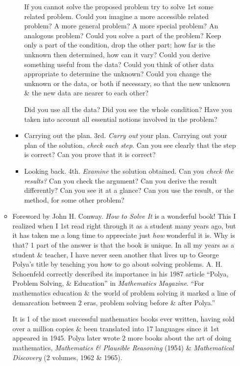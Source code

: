 \documentclass{article}
\begin{document}
\begin{enumerate}
\begin{itemize}
\begin{itemize}
			If you cannot solve the proposed problem try to solve 1st some related problem. Could you imagine a more accessible related problem? A more general problem? A more special problem? An analogous problem? Could you solve a part of the problem? Keep only a part of the condition, drop the other part; how far is the unknown then determined, how can it vary? Could you derive something useful from the data? Could you think of other data appropriate to determine the unknown? Could you change the unknown or the data, or both if necessary, so that the new unknown \& the new data are nearer to each other?
			
			Did you use all the data? Did you see the whole condition? Have you taken into account all essential notions involved in the problem?
			\item {\sc Carrying out the plan.} 3rd. {\it Carry out} your plan. Carrying out your plan of the solution, {\it check each step}. Can you see clearly that the step is correct? Can you prove that it is correct?
			\item {\sc Looking back}. 4th. {\it Examine} the solution obtained. Can you {\it check the results?} Can you check the argument? Can you derive the result differently? Can you see it at a glance? Can you use the result, or the method, for some other problem?
		\end{itemize}
		\item {\sf Foreword by {\sc John H. Conway}.} {\it How to Solve It} is a wonderful book! This I realized when I 1st read right through it as a student many years ago, but it has taken me a long time to appreciate just {\it how} wonderful it is. Why is that? 1 part of the answer is that the book is unique. In all my years as a student \& teacher, I have never seen another that lives up to {\sc George Polya}'s title by teaching you how to go about solving problems. {\sc A. H. Schoenfeld} correctly described its importance in his 1987 article ``{\sc Polya}, Problem Solving, \& Education'' in {\it Mathematics Magazine}. ``For mathematics education \& the world of problem solving it marked a line of demarcation between 2 eras, problem solving before \& after {\sc Polya}.''
		
		It is 1 of the most successful mathematics books ever written, having sold over a million copies \& been translated into 17 languages since it 1st appeared in 1945. {\sc Polya} later wrote 2 more books about the art of doing mathematics, {\it Mathematics \& Plausible Reasoning} (1954) \& {\it Mathematical Discovery} (2 volumes, 1962 \& 1965).
		

\end{itemize}
\end{enumerate}
\end{document}
